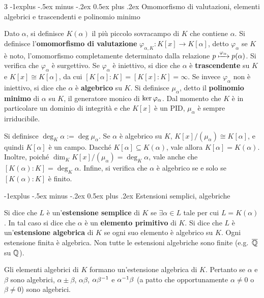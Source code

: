 \documentclass[10pt,landscape]{article}
\makeatletter
\renewcommand{\subsection}{\@startsection{subsection}{2}{0mm}%
	{-1explus -.5ex minus -.2ex}%
	{0.5ex plus .2ex}%
	{\normalfont\normalsize\bfseries}}
\makeatother
\begin{document}
\begin{multicols}{3}
	\subsection{Omomorfismo di valutazioni, elementi algebrici e trascendenti e polinomio minimo}

	Dato $\alpha$, si definisce $K(\alpha)$ il più piccolo
	sovracampo di $K$ che contiene $\alpha$. Si definisce l'\textbf{omomorfismo di
		valutazione} $\varphi_{\alpha, K} : K[x] \to K[\alpha]$, detto
	$\varphi_\alpha$ se $K$ è noto, l'omomorfismo completamente
	determinato dalla relazione $p \xmapsto{\varphi_\alpha} p(\alpha)$. Si verifica che $\varphi_\alpha$ è
	surgettivo. Se $\varphi_\alpha$ è iniettivo,
	si dice che $\alpha$ è \textbf{trascendente} su $K$ e
	$K[x] \cong K[\alpha]$, da cui $[K[\alpha] : K] =
		[K[x] : K] = \infty$. Se invece $\varphi_\alpha$ non
	è iniettivo, si dice che $\alpha$ è \textbf{algebrico}
	su $K$. Si definisce $\mu_\alpha$, detto il \textbf{polinomio
		minimo} di $\alpha$ su $K$, il generatore monico
	di $\operatorname{ker} \varphi_\alpha$. Dal momento che $K$ è
	in particolare un dominio di integrità e che $K[x]$ è un PID,
	$\mu_\alpha$ è sempre irriducibile. \smallskip

	Si definisce
	$\deg_K \alpha := \deg \mu_\alpha$. Se $\alpha$ è
	algebrico su $K$, $K[x] / (\mu_\alpha) \cong
		K[\alpha]$, e quindi $K[\alpha]$ è un campo. Dacché
	$K[\alpha] \subseteq K(\alpha)$, vale allora
	$K[\alpha] = K(\alpha)$. Inoltre, poiché $\dim_K K[x] / (\mu_\alpha) = \deg_K \alpha$, vale
	anche che $[K(\alpha) : K] = \deg_K \alpha$.
	Infine, si verifica che $\alpha$ è algebrico se e solo se
	$[K(\alpha) : K]$ è finito. \smallskip

	\subsection{Estensioni semplici, algebriche}

	Si dice che $L$ è un'\textbf{estensione semplice} di
	$K$ se $\exists \alpha \in L$ tale per cui $L = K(\alpha)$.
	In tal caso si dice che $\alpha$ è un \textbf{elemento primitivo} di $K$. Si dice che $L$ è un'\textbf{estensione
		algebrica} di $K$ se ogni suo elemento è algebrico su $K$.
	Ogni estensione finita è algebrica. Non tutte le
	estensioni algebriche sono finite (e.g.~$\overline{\mathbb Q}$ su $\mathbb Q$). \smallskip

	Gli elementi algebrici di $K$ formano un'estensione algebrica di $K$.
	Pertanto se $\alpha$ e $\beta$ sono algebrici,
	$\alpha \pm \beta$, $\alpha \beta$, $\alpha \beta^{-1}$
	e $\alpha^{-1} \beta$ (a patto che opportunamente $\alpha \neq 0$ o
	$\beta \neq 0$) sono algebrici. \smallskip


\end{multicols}
\end{document}
